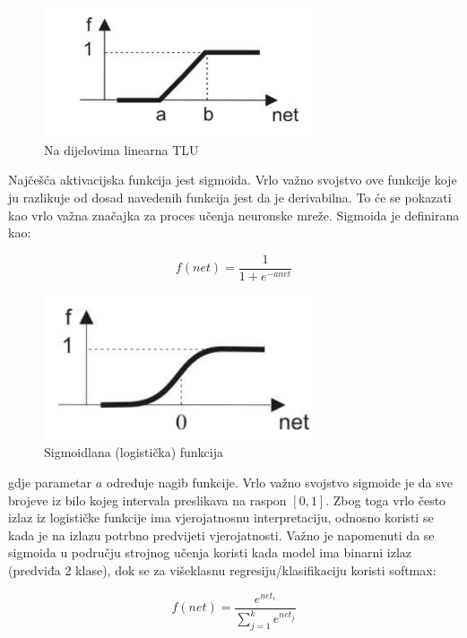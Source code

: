 \begin{figure}[H]
\centering
\includegraphics[width=8cm]{img/LinearTLU.png}
\caption{Na dijelovima linearna TLU}
\label{img:linear-tlu}
\end{figure}

Najčešća aktivacijska funkcija jest sigmoida. Vrlo važno svojstvo ove funkcije koje ju razlikuje od dosad navedenih funkcija jest da je derivabilna. To će se pokazati kao vrlo važna značajka za proces učenja neuronske mreže. Sigmoida je definirana kao:

\begin{equation}
f(net) = \frac{1}{1 + e^{-a net}}
\label{eq:sigmoid}
\end{equation}

\begin{figure}[H]
\centering
\includegraphics[width=8cm]{img/Sigmoid.png}
\caption{Sigmoidlana (logistička) funkcija}
\label{img:sigmoid}
\end{figure}

gdje parametar $a$ određuje nagib funkcije. Vrlo važno svojstvo sigmoide je da sve brojeve iz bilo kojeg intervala preslikava na raspon $[0,1]$. Zbog toga vrlo često izlaz iz logističke funkcije ima vjerojatnosnu interpretaciju, odnosno koristi se kada je na izlazu potrbno predvijeti vjerojatnosti. Važno je napomenuti da se sigmoida u području strojnog učenja koristi kada model ima binarni izlaz (predviđa 2 klase), dok se za višeklasnu regresiju/klasifikaciju koristi softmax:

\begin{equation}
f(net) = \frac{e^{net_i}}{\sum_{j=1}^{k} e^{net_j}}
\label{eq:sigmoid}
\end{equation}

